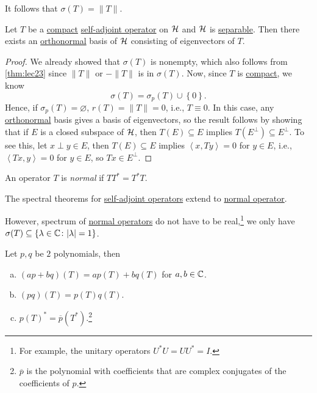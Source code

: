 \begin{remark}
	It follows that \(\sigma (T) = \lVert T \rVert \).
\end{remark}

\begin{theorem}
	Let \(T\) be a \hyperref[def:compact-op]{compact} \hyperref[def:self-adjoint-op]{self-adjoint operator} on \(\mathcal{\MakeUppercase{h}} \) and \(\mathcal{\MakeUppercase{h}} \) is \hyperref[def:separable]{separable}. Then there exists an \hyperref[def:orthonormal-system]{orthonormal} basis of \(\mathcal{\MakeUppercase{h}} \) consisting of eigenvectors of \(T\).
\end{theorem}
\begin{proof}
	We already showed that \(\sigma (T)\) is nonempty, which also follows from \autoref{thm:lec23} since \(\lVert T \rVert \) or \(-\lVert T \rVert \) is in \(\sigma (T)\). Now, since \(T\) is \hyperref[def:compact-op]{compact}, we know
	\[
		\sigma (T) = \sigma _p(T) \cup \left\{ 0 \right\}.
	\]
	Hence, if \(\sigma _p(T)= \varnothing \), \(r(T) = \lVert T \rVert = 0\), i.e., \(T \equiv 0\). In this case, any \hyperref[def:orthonormal-system]{orthonormal} basis gives a basis of eigenvectors, so the result follows by showing that if \(E\) is a closed subspace of \(\mathcal{\MakeUppercase{h}} \), then \(T(E) \subseteq E\) implies \(T(E^{\perp} ) \subseteq E^{\perp} \). To see this, let \(x \perp y \in E\), then \(T(E) \subseteq E\) implies \(\left\langle x, Ty \right\rangle = 0\) for \(y\in E\), i.e., \(\left\langle Tx, y \right\rangle = 0\) for \(y\in E\), so \(Tx\in E^{\perp} \).
\end{proof}

\begin{definition}\label{def:normal-op}
	An operator \(T\) is \emph{normal} if \(T T^{\ast} = T^{\ast} T\).
\end{definition}

\begin{remark}
	The spectral theorems for \hyperref[def:self-adjoint-op]{self-adjoint operators} extend to \hyperref[def:normal-op]{normal operator}.
\end{remark}

However, spectrum of \hyperref[def:normal-op]{normal operators} do not have to be real,\footnote{For example, the unitary operators \(U^{\ast} U = U U^{\ast} = I\).} we only have \(\sigma (T) \subseteq \left\{ \lambda \in \mathbb{\MakeUppercase{c}} \colon \vert \lambda  \vert =1 \right\} \).

\begin{theorem}
	Let \(p, q\) be \(2\) polynomials, then
	\begin{enumerate}[(a)]
		\item \((ap + bq)(T) = ap(T) + bq(T)\) for \(a, b\in \mathbb{\MakeUppercase{c}} \).
		\item \((pq)(T) = p(T) q(T)\).
		\item \(p(T)^{\ast} = \overline{p} (T^{\ast} )\).\footnote{\(\overline{p} \) is the polynomial with coefficients that are complex conjugates of the coefficients of \(p\).}
	\end{enumerate}
\end{theorem}


